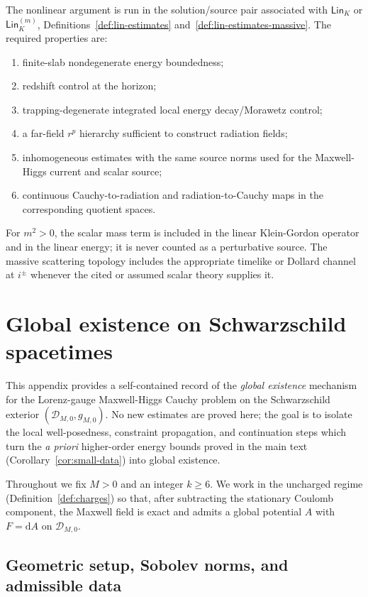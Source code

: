 \documentclass[11pt]{article}
\numberwithin{equation}{section}
\theoremstyle{plain}
\theoremstyle{definition}
\theoremstyle{remark}
\newcommand{\dd}{\mathrm{d}}
\newcommand{\Lin}{\mathsf{Lin}}
\begin{document}
The nonlinear argument is run in the solution/source pair associated with \(\Lin_K\) or \(\Lin_K^{(m)}\), Definitions~\ref{def:lin-estimates} and~\ref{def:lin-estimates-massive}.  The required properties are:
\begin{enumerate}
\item finite-slab nondegenerate energy boundedness;
\item redshift control at the horizon;
\item trapping-degenerate integrated local energy decay/Morawetz control;
\item a far-field \(r^p\) hierarchy sufficient to construct radiation fields;
\item inhomogeneous estimates with the same source norms used for the Maxwell-Higgs current and scalar source;
\item continuous Cauchy-to-radiation and radiation-to-Cauchy maps in the corresponding quotient spaces.
\end{enumerate}
For \(m^2>0\), the scalar mass term is included in the linear Klein-Gordon operator and in the linear energy; it is never counted as a perturbative source.  The massive scattering topology includes the appropriate timelike or Dollard channel at \(i^\pm\) whenever the cited or assumed scalar theory supplies it.


\section{Global existence on Schwarzschild spacetimes}
\label{app:global-existence-schwarzschild}

This appendix provides a self-contained record of the \emph{global existence} mechanism for the Lorenz-gauge Maxwell-Higgs
Cauchy problem on the Schwarzschild exterior $(\mathcal D_{M,0},g_{M,0})$.
No new estimates are proved here; the goal is to isolate the local well-posedness, constraint propagation, and continuation steps
which turn the \emph{a priori} higher-order energy bounds proved in the main text (Corollary~\ref{cor:small-data}) into global existence.

Throughout we fix $M>0$ and an integer $k\ge 6$.
We work in the uncharged regime (Definition~\ref{def:charges}) so that, after subtracting the stationary Coulomb component,
the Maxwell field is exact and admits a global potential $A$ with $F=\dd A$ on $\mathcal D_{M,0}$.

\subsection{Geometric setup, Sobolev norms, and admissible data}\label{app:schw-setup}
\end{document}
